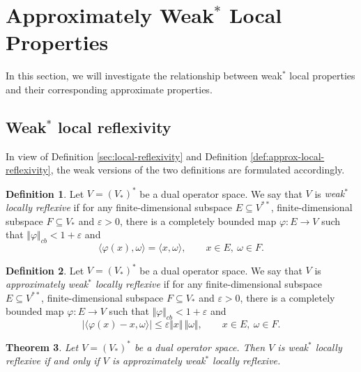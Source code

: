 \documentclass[12pt]{article}
\newtheorem{theorem}{Theorem}[section]
\theoremstyle{definition}
\newtheorem{definition}[theorem]{Definition}
\theoremstyle{remark}
\begin{document}
\section{Approximately Weak$^{*}$ Local Properties}\label{sec:dual}

In this section, we will investigate the relationship between weak$^*$ local properties and their corresponding approximate properties.

\subsection{Weak$^{*}$ local reflexivity}

In view of Definition \ref{sec:local-reflexivity} and Definition \ref{def:approx-local-reflexivity}, the weak versions of the two definitions are formulated accordingly.


\begin{definition}\label{def:weak-star-local-reflexivity}
Let $V=(V_*)^*$ be a dual operator space. We say that $V$ is
\emph{weak$^{*}$ locally reflexive} if for any finite-dimensional
subspace $E\subseteq V^{**}$,  finite-dimensional subspace
$F\subseteq V_*$ and  $\varepsilon>0$, there is a completely
boun\-ded map $\varphi:E\to V$ such that $\Vert \varphi\Vert_{cb}<1+\varepsilon$
and
\[
\langle \varphi(x),\omega\rangle=\langle x,\omega\rangle,
\qquad x\in E,\ \omega\in F.
\]
\end{definition}





\begin{definition}\label{def:approx-weak-star-local-reflexivity}
Let $V=(V_*)^*$ be a dual operator space. We say that $V$ is
\emph{approximately weak$^{*}$ locally reflexive} if for any
finite-dimensional subspace $E\subseteq V^{**}$, 
finite-dimensional subspace $F\subseteq V_*$ and 
$\varepsilon>0$, there is a completely bounded map $\varphi:E\to V$ such that
$\Vert \varphi\Vert_{cb}<1+\varepsilon$ and
\[
|\langle \varphi(x)-x,\omega\rangle|
\le\varepsilon\Vert x\Vert\,\Vert\omega\Vert,
\qquad x\in E,\ \omega\in F.
\]
\end{definition}

\begin{theorem}\label{thm:approx-weak-star-local-reflexivity}
Let $V=(V_*)^*$ be a dual operator space. Then $V$ is weak$^{*}$
locally reflexive if and only if $V$ is approximately weak$^{*}$
locally reflexive.
\end{theorem}
\end{document}
